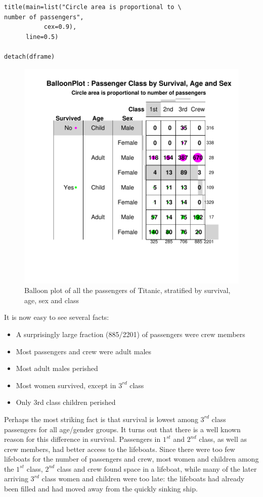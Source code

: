 \documentclass[a4paper]{report}
\begin{document}
\begin{article}
{\begin{verbatim}
title(main=list("Circle area is proportional to \
number of passengers",
           cex=0.9),
      line=0.5)

detach(dframe)
\end{verbatim}
 }

\begin{figure}
\includegraphics[width=\textwidth]{Figure4.pdf}
\caption{\label{figure:Figure4}
Balloon plot of all the passengers of Titanic, stratified by survival,
age, sex and class}
\end{figure}

It is now easy to see several facts:
\begin{itemize}
\item A surprisingly large fraction (885/2201) of passengers were crew
      members
\item Most passengers and crew were adult males 
\item Most adult males perished
\item Most women survived, except in $3^{rd}$ class
\item Only 3rd class children perished
\end{itemize}

Perhaps the most striking fact is that survival is lowest among
$3^{rd}$ class passengers for all age/gender groups.  It turns out
that there is a well known reason for this difference in survival.
Passengers in $1^{st}$ and $2^{nd}$ class, as well as crew members,
had better access to the lifeboats.  Since there were too few
lifeboats for the number of passengers and crew, most women and
children among the $1^{st}$ class, $2^{nd}$ class and crew found space
in a lifeboat, while many of the later arriving $3^{rd}$ class women
and children were too late: the lifeboats had already been filled and
had moved away from the quickly sinking ship.


\end{article}
\end{document}
